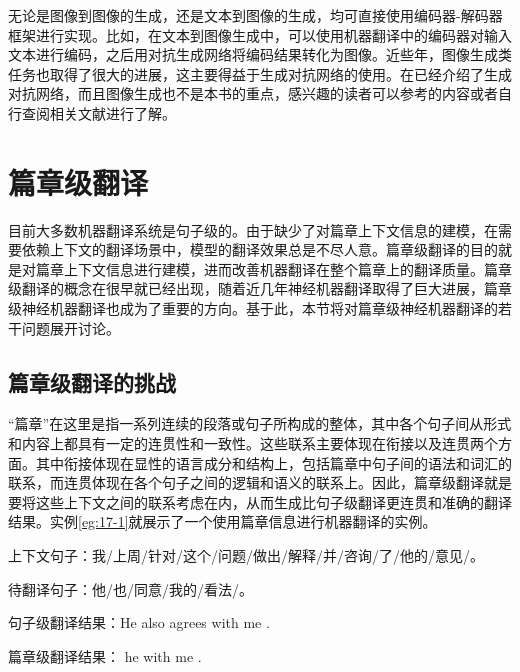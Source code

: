 \parinterval 无论是图像到图像的生成，还是文本到图像的生成，均可直接使用编码器-解码器框架进行实现。比如，在文本到图像生成中，可以使用机器翻译中的编码器对输入文本进行编码，之后用对抗生成网络将编码结果转化为图像。近些年，图像生成类任务也取得了很大的进展，这主要得益于生成对抗网络的使用。在{\chapterthirteen}已经介绍了生成对抗网络，而且图像生成也不是本书的重点，感兴趣的读者可以参考{\chapterthirteen}的内容或者自行查阅相关文献进行了解。

\sectionnewpage
\section{篇章级翻译}

\parinterval 目前大多数机器翻译系统是句子级的。由于缺少了对篇章上下文信息的建模，在需要依赖上下文的翻译场景中，模型的翻译效果总是不尽人意。篇章级翻译的目的就是对篇章上下文信息进行建模，进而改善机器翻译在整个篇章上的翻译质量。篇章级翻译的概念在很早就已经出现，随着近几年神经机器翻译取得了巨大进展，篇章级神经机器翻译也成为了重要的方向。基于此，本节将对篇章级神经机器翻译的若干问题展开讨论。


\subsection{篇章级翻译的挑战}

\parinterval “篇章”在这里是指一系列连续的段落或句子所构成的整体，其中各个句子间从形式和内容上都具有一定的连贯性和一致性。这些联系主要体现在衔接以及连贯两个方面。其中衔接体现在显性的语言成分和结构上，包括篇章中句子间的语法和词汇的联系，而连贯体现在各个句子之间的逻辑和语义的联系上。因此，篇章级翻译就是要将这些上下文之间的联系考虑在内，从而生成比句子级翻译更连贯和准确的翻译结果。实例\ref{eg:17-1}就展示了一个使用篇章信息进行机器翻译的实例。

\begin{example}
上下文句子：我/上周/针对/这个/问题/做出/解释/并/咨询/了/他的/意见/。

\hspace{2em} 待翻译句子：他/也/同意/我的/看法/。

\hspace{2em} 句子级翻译结果：He also agrees with me .

\hspace{2em} 篇章级翻译结果：{} he {} with me .

\label{eg:17-1}
\end{example}

